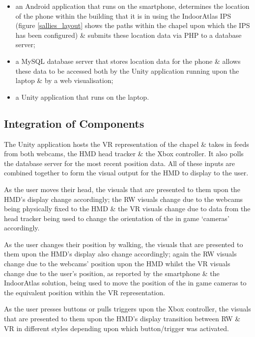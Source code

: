 \begin{itemize}
	\item an Android application that runs on the smartphone, determines the location of the phone within the building that it is in using the IndoorAtlas IPS~\cite{IndoorAtlasLtd.2012} (figure \ref{sallies_layout} shows the paths within the chapel upon which the IPS has been configured) \& submits these location data via PHP to a database server;
	\item a MySQL database server that stores location data for the phone \& allows these data to be accessed both by the Unity application running upon the laptop \& by a web visualisation;
	\item a Unity application that runs on the laptop.
\end{itemize}


\subsection{Integration of Components}
The Unity application hosts the VR representation of the chapel \& takes in feeds from both webcams, the HMD head tracker \& the Xbox controller. It also polls the database server for the most recent position data. All of these inputs are combined together to form the visual output for the HMD to display to the user.

As the user moves their head, the visuals that are presented to them upon the HMD's display change accordingly; the RW visuals change due to the webcams being physically fixed to the HMD \& the VR visuals change due to data from the head tracker being used to change the orientation of the in game `cameras' accordingly.

As the user changes their position by walking, the visuals that are presented to them upon the HMD's display also change accordingly; again the RW visuals change due to the webcams' position upon the HMD whilst the VR visuals change due to the user's position, as reported by the smartphone \& the IndoorAtlas solution, being used to move the position of the in game cameras to the equivalent position within the VR representation.

As the user presses buttons or pulls triggers upon the Xbox controller, the visuals that are presented to them upon the HMD's display transition between RW \& VR in different styles depending upon which button/trigger was activated.

